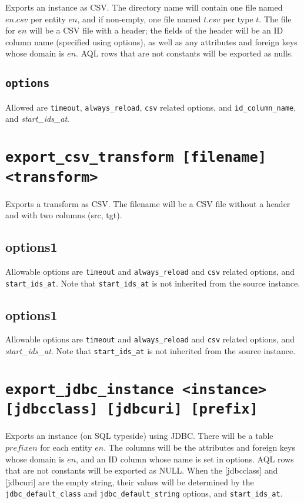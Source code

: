 \documentclass[10pt]{book}
\begin{document}
Exports an instance as CSV.  The directory name will contain one file named $en.csv$ per entity $en$, and if non-empty, one file named $t.csv$ per type $t$.  The file for $en$ will be a CSV file with a header; the fields of the header will be an ID column name (specified using options), as well as any attributes and foreign keys whose domain is $en$.   AQL rows that are not constants will be exported as nulls.

\subsection{{\tt options}}
Allowed are {\tt timeout}, {\tt always\_reload}, {\tt csv} related options, and {\tt id\_column\_name}, and {\it start\_ids\_at}.

\section{{\tt export\_csv\_transform [filename] <transform>}}

Exports a transform as CSV.  The filename will be a CSV file without a header and with two columns (src, tgt).  

\subsection{options1}
Allowable options are {\tt timeout} and {\tt always\_reload}  and {\tt csv} related options, and {\tt start\_ids\_at}.  Note that {\tt start\_ids\_at} is not inherited from the source instance.

\subsection{options1}
Allowable options are {\tt timeout} and {\tt always\_reload}  and {\tt csv} related options, and {\it start\_ids\_at}.  Note that {\tt start\_ids\_at} is not inherited from the source instance.

\section{{\tt export\_jdbc\_instance <instance> [jdbcclass] [jdbcuri] [prefix] }}

Exports an instance (on SQL typeside) using JDBC.  There will be a table $prefixen$ for each entity $en$.  The columns will be the attributes and foreign keys whose domain is $en$, and an ID column whose name is set in options.  AQL rows that are not constants will be exported as NULL.  When the [jdbcclass] and [jdbcuri] are the empty string, their values will be determined by the {\tt jdbc\_default\_class} and {\tt jdbc\_default\_string} options, and {\tt start\_ids\_at}.
\end{document}
